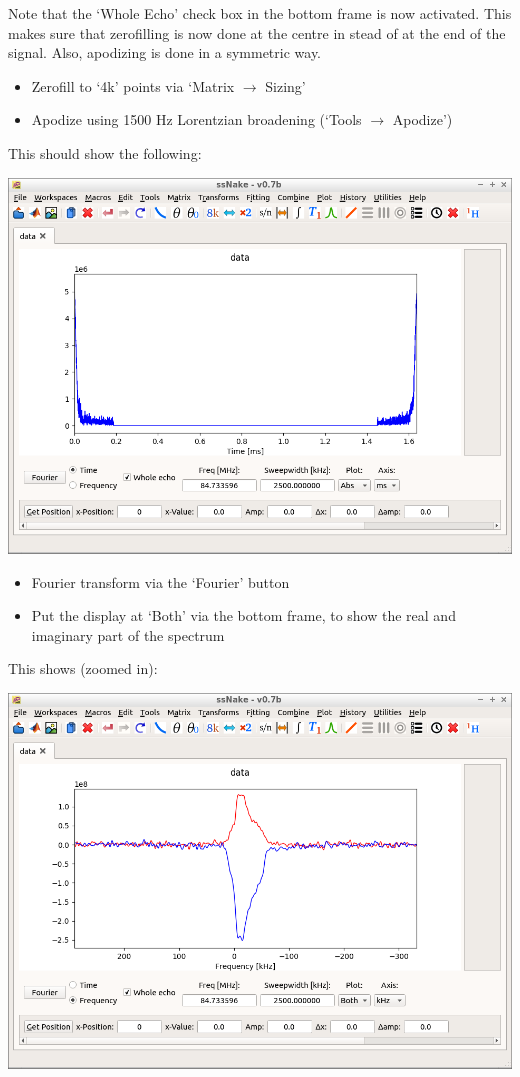 \documentclass[11pt,a4paper]{article}
\begin{document}
Note that the `Whole Echo' check box in the bottom frame is now activated. This makes sure that zerofilling is now done at the centre in stead of at the end of the signal. Also, apodizing is done in a symmetric way.
\begin{itemize}
\item Zerofill to `4k' points via `Matrix $\longrightarrow$ Sizing' 
\item Apodize using 1500 Hz Lorentzian broadening (`Tools  $\longrightarrow$ Apodize')
\end{itemize}
This should show the following:
\begin{center}
\includegraphics[width=0.8\linewidth]{Figs/Fig2.png}
\end{center}

\begin{itemize}
\item Fourier transform via the `Fourier' button
\item Put the display at `Both' via the bottom frame, to show the real and imaginary part of the spectrum
\end{itemize}
This shows (zoomed in):
\begin{center}
\includegraphics[width=0.8\linewidth]{Figs/Fig3.png}
\end{center}
\end{document}
